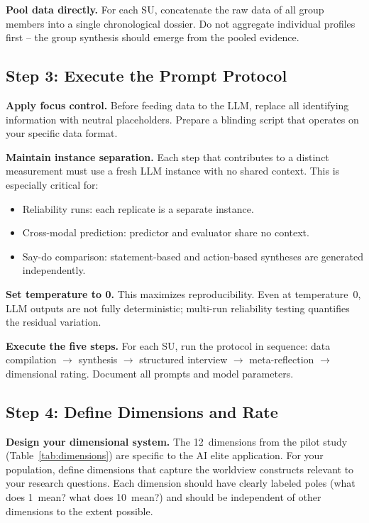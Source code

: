 \documentclass[11pt,a4paper]{article}
\begin{document}
\textbf{Pool data directly.} For each SU, concatenate the raw data of all group members into a single chronological dossier. Do not aggregate individual profiles first -- the group synthesis should emerge from the pooled evidence.

\subsection{Step 3: Execute the Prompt Protocol}
\label{sec:app:step3}

\textbf{Apply focus control.} Before feeding data to the LLM, replace all identifying information with neutral placeholders. Prepare a blinding script that operates on your specific data format.

\textbf{Maintain instance separation.} Each step that contributes to a distinct measurement must use a fresh LLM instance with no shared context. This is especially critical for:
\begin{itemize}[nosep]
  \item Reliability runs: each replicate is a separate instance.
  \item Cross-modal prediction: predictor and evaluator share no context.
  \item Say-do comparison: statement-based and action-based syntheses are generated independently.
\end{itemize}

\textbf{Set temperature to 0.} This maximizes reproducibility. Even at temperature~0, LLM outputs are not fully deterministic; multi-run reliability testing quantifies the residual variation.

\textbf{Execute the five steps.} For each SU, run the protocol in sequence: data compilation $\to$ synthesis $\to$ structured interview $\to$ meta-reflection $\to$ dimensional rating. Document all prompts and model parameters.

\subsection{Step 4: Define Dimensions and Rate}
\label{sec:app:step4}

\textbf{Design your dimensional system.} The 12~dimensions from the pilot study (Table~\ref{tab:dimensions}) are specific to the AI elite application. For your population, define dimensions that capture the worldview constructs relevant to your research questions. Each dimension should have clearly labeled poles (what does 1~mean? what does 10~mean?) and should be independent of other dimensions to the extent possible.
\end{document}
